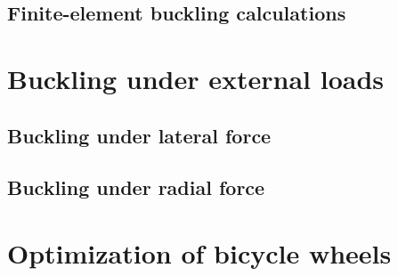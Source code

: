 \documentclass{nuthesis}
\begin{document}
\section{Finite-element buckling calculations}


\chapter{Buckling under external loads}
\section{Buckling under lateral force}
\section{Buckling under radial force}


\chapter{Optimization of bicycle wheels}
\end{document}
